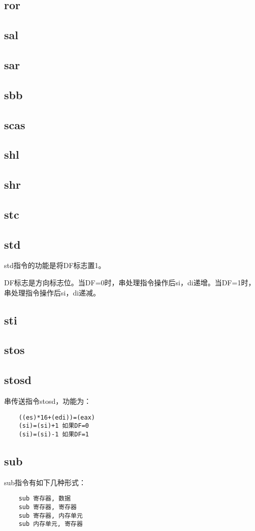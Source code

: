 \documentclass[a4paper,left=2.5cm,right=2.5cm,11pt]{article}
\begin{document}
\subsection{ror}
\subsection{sal}
\subsection{sar}
\subsection{sbb}
\subsection{scas}
\subsection{shl}
\subsection{shr}
\subsection{stc}
\subsection{std}
	std指令的功能是将DF标志置1。\par
	DF标志是方向标志位。当DF=0时，串处理指令操作后si，di递增。当DF=1时，串处理指令操作后si，di递减。

\subsection{sti}
\subsection{stos}
\subsection{stosd}
	串传送指令stosd，功能为：
	\begin{lstlisting}
	((es)*16+(edi))=(eax)
	(si)=(si)+1 如果DF=0
	(si)=(si)-1 如果DF=1
	\end{lstlisting}

\subsection{sub}
	sub指令有如下几种形式：
	\begin{lstlisting}
	sub 寄存器, 数据
	sub 寄存器, 寄存器
	sub 寄存器, 内存单元
	sub 内存单元, 寄存器
	\end{lstlisting}
	
\end{document}
